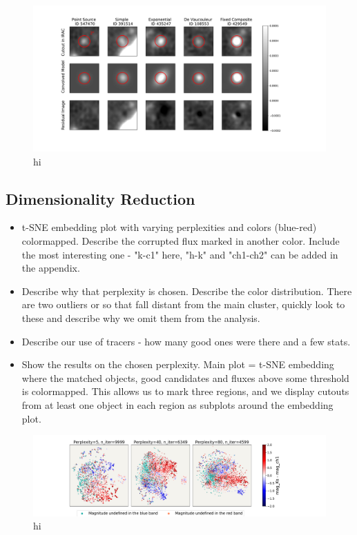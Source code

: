 \begin{figure}[h!]
    \centering
    \includegraphics[trim={3cm 2.5cm 5cm 1.5cm},clip,scale=0.5]{Code/Saved_Figures/Model_cutouts.pdf}
    \caption{hi}
    \label{Model_cutouts}
\end{figure}

\subsection{Dimensionality Reduction}
\begin{itemize}
    \item t-SNE embedding plot with varying perplexities and colors (blue-red) colormapped. Describe the corrupted flux marked in another color. Include the most interesting one - "k-c1" here, "h-k" and "ch1-ch2" can be added in the appendix.
    \item Describe why that perplexity is chosen. Describe the color distribution. There are two outliers or so that fall distant from the main cluster, quickly look to these and describe why we omit them from the analysis.
    \item Describe our use of tracers - how many good ones were there and a few stats.
    \item Show the results on the chosen perplexity. Main plot = t-SNE embedding where the matched objects, good candidates and fluxes above some threshold is colormapped. This allows us to mark three regions, and we display cutouts from at least one object in each region as subplots around the embedding plot.
\end{itemize}

\begin{figure}[h!]
    \centering %
    \includegraphics[trim={5cm 0cm 5cm 0.5cm},clip,width=\textwidth]{Code/Saved_Figures/peplex_Ks_ch1_SMALL.pdf}
    \caption{hi}
    \label{SMALL_embeddding_ks_ch1}
\end{figure}

